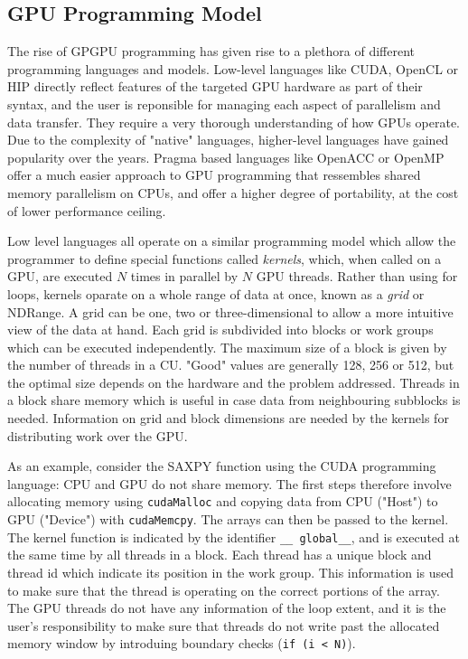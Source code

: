 \subsection{GPU Programming Model}

The rise of GPGPU programming has given rise to a plethora of different programming languages and models. Low-level languages like CUDA, OpenCL or HIP directly reflect features of the targeted GPU hardware as part of their syntax, and the user is reponsible for managing each aspect of parallelism and data transfer. They require a very thorough understanding of how GPUs operate. Due to the complexity of "native" languages, higher-level languages have gained popularity over the years. Pragma based languages like OpenACC or OpenMP offer a much easier approach to GPU programming that ressembles shared memory parallelism on CPUs, and offer a higher degree of portability, at the cost of lower performance ceiling.

Low level languages all operate on a similar programming model which allow the programmer to define special functions called \emph{kernels}, which, when called on a GPU, are executed $N$ times in parallel by $N$ GPU threads. Rather than using for loops, kernels oparate on a whole range of data at once, known as a \emph{grid} or NDRange. A grid can be one, two or three-dimensional to allow a more intuitive view of the data at hand. Each grid is subdivided into blocks or work groups which can be executed independently. The maximum size of a block is given by the number of threads in a CU. "Good" values are generally 128, 256 or 512, but the optimal size depends on the hardware and the problem addressed. Threads in a block share memory which is useful in case data from neighbouring subblocks is needed. Information on grid and block dimensions are needed by the kernels for distributing work over the GPU.

As an example, consider the SAXPY function using the CUDA programming language:
\noindent CPU and GPU do not share memory. The first steps therefore involve allocating memory using \texttt{cudaMalloc} and copying data from CPU ("Host") to GPU ("Device") with \texttt{cudaMemcpy}. The arrays can then be passed to the kernel. The kernel function is indicated by the identifier \texttt{\_\_ global\_\_}, and is executed at the same time by all threads in a block. Each thread has a unique block and thread id which indicate its position in the work group. This information is used to make sure that the thread is operating on the correct portions of the array. The GPU threads do not have any information of the loop extent, and it is the user's responsibility to make sure that threads do not write past the allocated memory window by introduing boundary checks (\texttt{if (i < N)}).

